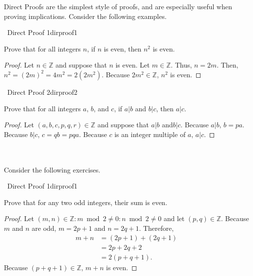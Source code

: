     Direct Proofs are the simplest style of proofs, and are especially useful when proving implications. Consider the following examples.
    
    \begin{example}{\Difficulty\,\Difficulty\,\,Direct Proof 1}{dirproof1}
    
    Prove that for all integers \(n\), if \(n\) is even, then \(n^2\) is even.
    
    \begin{proof}
        Let \(n\in\mathbb{Z}\) and suppose that \(n\) is even. Let \(m\in\mathbb{Z}\). Thus, \(n=2m\). Then, \(n^2=(2m)^2=4m^2=2(2m^2)\). Because \(2m^2\in\mathbb{Z}\), \(n^2\) is even.
    \end{proof}
    
    \end{example}
    \begin{example}{\Difficulty\,\Difficulty\,\,Direct Proof 2}{dirproof2}
    
    Prove that for all integers \(a\), \(b\), and \(c\), if \(a|b\) and \(b|c\), then \(a|c\).
    
    \begin{proof}
        Let \((a,b,c,p,q,r)\in\mathbb{Z}\) and suppose that \(a|b\) and\(b|c\). Because \(a|b\), \(b=pa\). Because \(b|c\), \(c=qb=pqa\). Because \(c\) is an integer multiple of \(a\), \(a|c\).
    \end{proof}
    
    \end{example}
    \vphantom
    \\
    \\
    Consider the following exercises.
    \begin{exercise}{\Difficulty\,\Difficulty\,\,Direct Proof 1}{dirproof1}
    
    Prove that for any two odd integers, their sum is even.
    
    \begin{proof}
        Let \((m,n)\in\mathbb{Z}:m\bmod2\neq0:n\bmod2\neq0\) and let \((p,q)\in\mathbb{Z}\). Because \(m\) and \(n\) are odd, \(m=2p+1\) and \(n=2q+1\). Therefore,
        \begin{align*}
            m+n&=(2p+1)+(2q+1) \\
            &=2p+2q+2 \\
            &=2(p+q+1).
        \end{align*}
        Because \((p+q+1)\in\mathbb{Z}\), \(m+n\) is even.
    \end{proof}
    
    \end{exercise}
